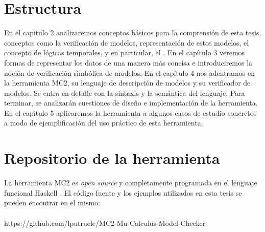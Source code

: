 \section{Estructura}
En el capítulo 2 analizaremos conceptos básicos para la comprensión de esta tesis, conceptos como la verificación de modelos, representación de estos modelos, el concepto de lógicas temporales, y en particular, el {\mucalculo}.
En el capítulo 3 veremos formas de representar los datos de una manera más concisa e introduciremos la noción de verificación simbólica de modelos.
En el capítulo 4 nos adentramos en la herramienta MC2, su lenguaje de descripción de modelos y su verificador de modelos. Se entra en detalle con la sintaxis y la semántica del lenguaje. Para terminar, se analizarán cuestiones de diseño e implementación de la herramienta. 
En el capítulo 5 aplicaremos la herramienta a algunos casos de estudio concretos a modo de ejemplificación del uso práctico de esta herramienta.

\section{Repositorio de la herramienta}

La herramienta MC2 es \emph{open source} y completamente programada en el lenguaje funcional Haskell \cite{Haskell:18}. El código fuente y los ejemplos utilizados en esta tesis se pueden encontrar en el mismo:\\
\\
https://github.com/lputruele/MC2-Mu-Calculus-Model-Checker




